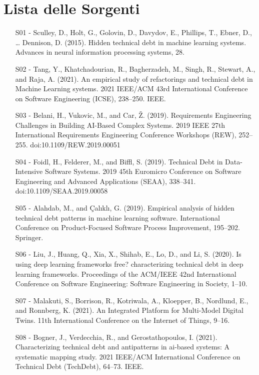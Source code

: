 \documentclass[a4paper,12pt,oneside,top=6cm,bottom=3cm,left=3.5cm,right=3.5cm,openright,reqno,table]{book}
\begin{document}
\section*{Lista delle Sorgenti} 
\begin{itemize}
\item[S01 -] Sculley, D., Holt, G., Golovin, D., Davydov, E., Phillips, T., Ebner, D., … Dennison, D. (2015). Hidden technical debt in machine learning systems. Advances in neural information processing systems, 28.

\item[S02 -]Tang, Y., Khatchadourian, R., Bagherzadeh, M., Singh, R., Stewart, A., and Raja, A. (2021). An empirical study of refactorings and technical debt in Machine Learning systems. 2021 IEEE/ACM 43rd International Conference on Software Engineering (ICSE), 238–250. IEEE.

\item[S03 -]Belani, H., Vukovic, M., and Car, Ž. (2019). Requirements Engineering Challenges in Building AI-Based Complex Systems. 2019 IEEE 27th International Requirements Engineering Conference Workshops (REW), 252–255. doi:10.1109/REW.2019.00051

\item[S04 -]Foidl, H., Felderer, M., and Biffl, S. (2019). Technical Debt in Data-Intensive Software Systems. 2019 45th Euromicro Conference on Software Engineering and Advanced Applications (SEAA), 338–341.\\
doi:10.1109/SEAA.2019.00058

\item[S05 -]Alahdab, M., and Çalıklı, G. (2019). Empirical analysis of hidden technical debt patterns in machine learning software. International Conference on Product-Focused Software Process Improvement, 195–202. Springer.

\item[S06 -]Liu, J., Huang, Q., Xia, X., Shihab, E., Lo, D., and Li, S. (2020). Is using deep learning frameworks free? characterizing technical debt in deep learning frameworks. Proceedings of the ACM/IEEE 42nd International Conference on Software Engineering: Software Engineering in Society, 1–10.

\item[S07 -]Malakuti, S., Borrison, R., Kotriwala, A., Kloepper, B., Nordlund, E., and Ronnberg, K. (2021). An Integrated Platform for Multi-Model Digital Twins. 11th International Conference on the Internet of Things, 9–16.

\item[S08 -]Bogner, J., Verdecchia, R., and Gerostathopoulos, I. (2021). Characterizing technical debt and antipatterns in ai-based systems: A systematic mapping study. 2021 IEEE/ACM International Conference on Technical Debt (TechDebt), 64–73. IEEE.

\end{itemize}

\end{document}
